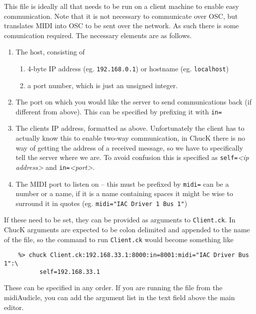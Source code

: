 \documentclass[../main.tex]{subfiles}
\begin{document}
This file is ideally all that needs to be run on a client machine to enable easy communication. Note that it is not necessary to communicate over OSC,
but translates MIDI into OSC to be sent over the network. As such there is some comunication required. The necessary elements are as follows.

\begin{enumerate} [\bf a)]
	\item The host, consisting of
	\begin{enumerate} [\bf i)]
		\item 4-byte IP address (eg. \texttt{192.168.0.1}) or hostname (eg. \texttt{localhost})
		\item a port number, which is just an unsigned integer.
	\end{enumerate}
	\item The port on which you would like the server to send communications back (if different from above). This can be specified by prefixing it with
		\texttt{in=}
	\item The clients IP address, formatted as above. Unfortunately the client has to actually know this to enable two-way communication, 
		in ChucK there is no way of getting the address of a received message, so we have to specifically tell the server where we are.
		To avoid confusion this is specified as \texttt{self=}\textit{<ip address>} and \texttt{in=}\textit{<port>}.
	\item The MIDI port to listen on -- this must be prefixed by \texttt{midi=} can be a number or a name, if it is a name containing spaces it might be
		 wise to surround it in quotes (eg. \texttt{midi="IAC Driver 1 Bus 1"})
		
\end{enumerate}
If these need to be set, they can be provided as arguments to \texttt{Client.ck}. In ChucK arguments are expected to be colon delimited and appended
to the name of the file, so the command to run \texttt{Client.ck} would become something like 
\begin{verbatim}
    %> chuck Client.ck:192.168.33.1:8000:in=8001:midi="IAC Driver Bus 1":\
    	  self=192.168.33.1
\end{verbatim}
These can be specified in any order.
If you are running the file from the midiAudicle, you can add the argument list in the text field above the main editor.
\end{document}
